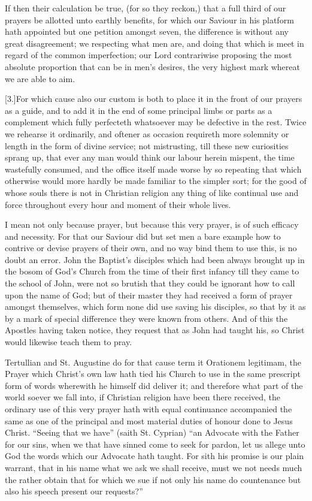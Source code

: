 If then their calculation be true, (for so they reckon,) that a full third of our prayers be allotted unto earthly benefits, for which our Saviour in his platform hath appointed but one petition amongst seven, the difference is without any great disagreement; we respecting what men are, and doing that which is meet in regard of the common imperfection; our Lord contrariwise proposing the most absolute proportion that can be in men’s desires, the very highest mark whereat we are able to aim.

[3.]For which cause also our custom is both to place it in the front of our prayers as a guide, and to add it in the end of some principal limbs or parts as a complement which fully perfecteth whatsoever may be defective in the rest. Twice we rehearse it ordinarily, and oftener as occasion requireth more solemnity or length in the form of divine service; not mistrusting, till these new curiosities sprang up, that ever any man would think our labour herein mispent, the time wastefully consumed, and the office itself made worse by so repeating that which otherwise would more hardly be made familiar to the simpler sort; for the good of whose souls there is not  in Christian religion any thing of like continual use and force throughout every hour and moment of their whole lives.

I mean not only because prayer, but because this very prayer, is of such efficacy and necessity. For that our Saviour did but set men a bare example how to contrive or devise prayers of their own, and no way bind them to use this, is no doubt an error. John the Baptist’s disciples which had been always brought up in the bosom of God’s Church from the time of their first infancy till they came to the school of John, were not so brutish that they could be ignorant how to call upon the name of God; but of their master they had received a form of prayer amongst themselves, which form none did use saving his disciples, so that by it as by a mark of special difference they were known from others. And of this the Apostles having taken notice, they request that as John had taught his, so Christ would likewise teach them to pray.

Tertullian and St. Augustine do for that cause term it Orationem legitimam, the Prayer which Christ’s own law hath tied his Church to use in the same prescript form of words wherewith he himself did deliver it; and therefore what part of the world soever we fall into, if Christian religion have been there received, the ordinary use of this very prayer hath with equal continuance accompanied the same as one of the principal and most material duties of honour done to Jesus Christ. “Seeing that we have” (saith St. Cyprian) “an Advocate with the Father for our sins, when we that have sinned come to seek for pardon, let us allege unto God the words which our Advocate hath taught. For sith his promise is our plain warrant, that in his name what we ask we shall receive, must we not needs much the rather obtain that for which we sue if not only his name do countenance but also his speech present our requests?”

